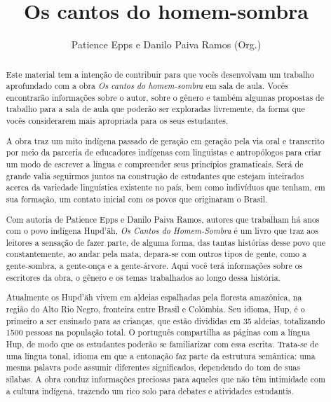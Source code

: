 \documentclass[11pt]{extarticle}
\newcommand{\AutorLivro}{Patience Epps e Danilo Paiva Ramos (Org.)}
\newcommand{\TituloLivro}{Os cantos do homem-sombra}
\newcommand{\colaborador}{Gabriela Karam}
\begin{document}
\title{\TituloLivro}
\author{\AutorLivro}
\def\authornotes{\colaborador}

\date{}
\maketitle


\tableofcontents


\begin{abstract}

Este material tem a intenção de contribuir para que vocês desenvolvam um trabalho aprofundado com a obra \textit{Os cantos do homem-sombra} em sala de aula.
Vocês encontrarão informações sobre o autor, sobre o gênero e também 
algumas propostas de trabalho para a sala de aula que poderão ser exploradas livremente, 
da forma que vocês considerarem mais apropriada para os seus estudantes.

A obra traz um mito indígena passado de geração em geração pela via oral e transcrito por meio da parceria de educadores indígenas com linguistas e antropólogos para criar um modo de escrever a língua e compreender seus princípios gramaticais. Será de grande valia seguirmos juntos na construção de estudantes que estejam inteirados acerca da variedade linguística existente no país, bem como indivíduos que tenham, em sua formação, um contato inicial com os povos que originaram o Brasil.

Com autoria de Patience Epps e Danilo Paiva Ramos, autores que trabalham há anos com o povo indígena Hupd'äh, \textit{Os Cantos do Homem-Sombra} é um livro que traz aos leitores a sensação de fazer parte, de alguma forma, das tantas histórias desse povo que constantemente, ao andar pela mata, depara-se com outros tipos de gente, como a gente-sombra, a gente-onça e a gente-árvore. Aqui você terá informações sobre os escritores da obra, o gênero e os temas trabalhados ao longo dessa história. 

Atualmente os Hupd'äh vivem em aldeias espalhadas pela floresta amazônica, na região do Alto Rio Negro, fronteira entre Brasil e Colômbia. Seu idioma, Hup, é o primeiro a ser ensinado para as crianças, que estão divididas em 35 aldeias, totalizando 1500 pessoas na população total. O português compartilha as páginas com a língua Hup, de modo que os estudantes poderão se familiarizar com essa escrita. Trata-se de uma língua tonal, idioma em que a entonação faz parte da estrutura semântica: uma mesma palavra pode assumir diferentes significados, dependendo do tom de suas sílabas. A obra conduz informações preciosas para aqueles que não têm intimidade com a cultura indígena, trazendo um rico solo para debates e atividades estudantis.


\end{abstract}
\end{document}
